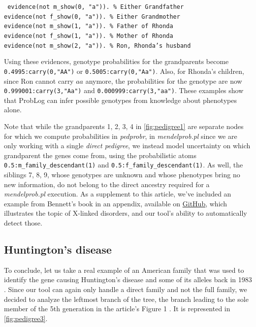 \documentclass{eptcs}
\begin{document}
 \begin{center} \tt
{}
evidence(not m\_show(0, "a")).  \% Either Grandfather \\
evidence(not f\_show(0, "a")). \% Either Grandmother \\
evidence(not m\_show(1, "a")). \% Father of Rhonda \\
evidence(not f\_show(1, "a")). \% Mother of Rhonda \\
evidence(not m\_show(2, "a")). \% Ron, Rhonda's husband
\end{center}

Using these evidences, genotype probabilities for the grandparents become \texttt{0.4995:carry(0,"AA")} or \texttt{0.5005:carry(0,"Aa")}. Also, for Rhonda's children, since Ron cannot carry $aa$ anymore, the probabilities for the genotype are now \texttt{0.999001:carry(3,"Aa")} and \texttt{0.000999:carry(3,"aa")}. These examples show that ProbLog can infer possible genotypes from knowledge about phenotypes alone.

Note that while the grandparents 1, 2, 3, 4 in \autoref{fig:pedigree1} are separate nodes for which we compute probabilities in \textit{pedprobr}, in \textit{mendelprob.pl} since we are only working with a single \textit{direct pedigree}, we instead model uncertainty on which grandparent the genes come from, using the probabilistic atoms \texttt{0.5:m\_family\_descendant(1)} and \texttt{0.5:f\_family\_descendant(1)}. As well, the siblings 7, 8, 9, whose genotypes are unknown and whose phenotypes bring no new information, do not belong to the direct ancestry required for a \textit{mendelprob.pl} execution. As a supplement to this article, we've included an example from Bennett's book in an appendix, available on \href{https://github.com/maxm4/mendelprob.pl/blob/main/appendix.pdf}{GitHub}, which illustrates the topic of X-linked disorders, and our tool's ability to automatically detect those. 


\subsection*{Huntington's disease}

To conclude, let us take a real example of an American family that was used to identify the gene causing Huntington's disease and some of its alleles back in 1983 \cite{gusella_polymorphic_1983}. Since our tool can again only handle a direct family and not the full family, we decided to analyze the leftmost branch of the tree, the branch leading to the sole member of the 5th generation in the article's Figure 1 \cite{gusella_polymorphic_1983}. It is represented in \autoref{fig:pedigree3}.
\end{document}
